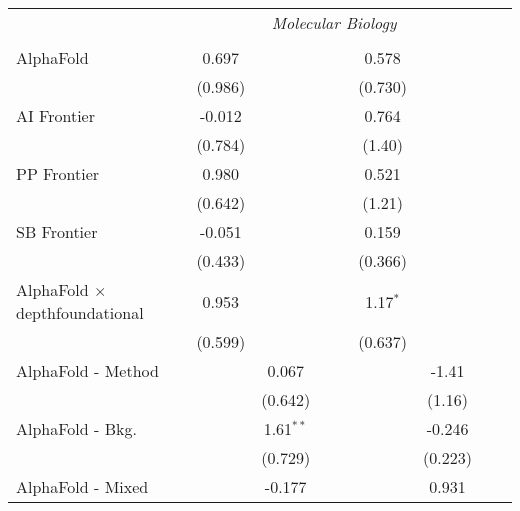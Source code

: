 \begin{tabular}{lcccccccc}
 & \multicolumn{6}{c}{\textit{Molecular Biology}} \\ \\
   AlphaFold                                      & 0.697   &               &      &      & 0.578      &              &      &   \\   
                                                  & (0.986) &               &      &      & (0.730)    &              &      &   \\   
   AI Frontier                                    & -0.012  &               &      &      & 0.764      &              &      &   \\   
                                                  & (0.784) &               &      &      & (1.40)     &              &      &   \\   
   PP Frontier                                    & 0.980   &               &      &      & 0.521      &              &      &   \\   
                                                  & (0.642) &               &      &      & (1.21)     &              &      &   \\   
   SB Frontier                                    & -0.051  &               &      &      & 0.159      &              &      &   \\   
                                                  & (0.433) &               &      &      & (0.366)    &              &      &   \\   
   AlphaFold $\times$ depthfoundational           & 0.953   &               &      &      & 1.17$^{*}$ &              &      &   \\   
                                                  & (0.599) &               &      &      & (0.637)    &              &      &   \\   
   AlphaFold - Method                             &         & 0.067         &      &      &            & -1.41        &      &   \\   
                                                  &         & (0.642)       &      &      &            & (1.16)       &      &   \\   
   AlphaFold - Bkg.                               &         & 1.61$^{**}$   &      &      &            & -0.246       &      &   \\   
                                                  &         & (0.729)       &      &      &            & (0.223)      &      &   \\   
   AlphaFold - Mixed                              &         & -0.177        &      &      &            & 0.931        &      &   \\   

\end{tabular}
